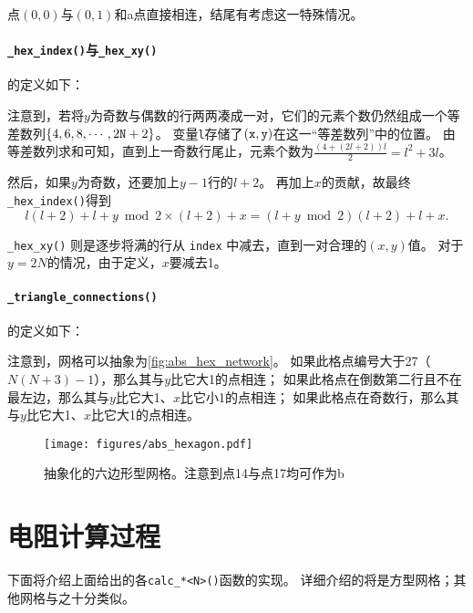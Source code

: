 点$(0,0)$与$(0,1)$和a点直接相连，结尾有考虑这一特殊情况。

\paragraph{\texttt{\_hex\_index()}与\texttt{\_hex\_xy()}}
的定义如下：{
    \linespread{1.0}
    
    
}
注意到，若将$y$为奇数与偶数的行两两凑成一对，它们的元素个数仍然组成一个等差数列$\{4,6,8,\cdots,2\text{\texttt{N}}+2\}$。
变量\verb|l|存储了$(\text{\texttt{x}},\text{\texttt{y}})$在这一“等差数列”中的位置。
由等差数列求和可知，直到上一奇数行尾止，元素个数为$\frac{(4+(2l+2))l}{2}=l^2+3l$。

然后，如果$y$为奇数，还要加上$y-1$行的$l+2$。
再加上$x$的贡献，故最终\verb|_hex_index()|得到\begin{equation}
    l(l+2)+l+y\bmod 2 \times(l+2)+x = (l+y\bmod 2)(l+2)+l+x.
\end{equation}

\verb|_hex_xy()| 则是逐步将满的行从 \verb|index| 中减去，直到一对合理的$(x,y)$值。
对于$y=2N$的情况，由于定义，$x$要减去1。

\paragraph{\texttt{\_triangle\_connections()}}
的定义如下：
{
    \linespread{1.0}
    
}

注意到，网格可以抽象为\autoref{fig:abs_hex_network}。
如果此格点编号大于27（$N(N+3)-1$），那么其与$y$比它大1的点相连；
如果此格点在倒数第二行且不在最左边，那么其与$y$比它大1、$x$比它小1的点相连；
如果此格点在奇数行，那么其与$y$比它大1、$x$比它大1的点相连。

\begin{figure}
    \centering
    \texttt{[image: figures/abs\_hexagon.pdf]}
    \caption{抽象化的六边形型网格。注意到点14与点17均可作为b}
    \label{fig:abs_hex_network}
\end{figure}

\section{电阻计算过程}
下面将介绍上面给出的各\verb|calc_*<N>()|函数的实现。
详细介绍的将是方型网格；其他网格与之十分类似。

